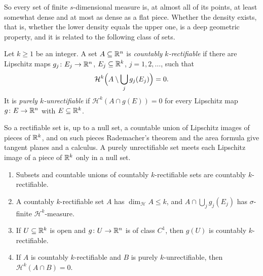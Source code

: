 So every set of finite $s$-dimensional measure is, at almost all of its points, at least somewhat dense and at most as dense as a flat piece. Whether the density exists, that is, whether the lower
density equals the upper one, is a deep geometric property, and it is related to the following class of sets.

\begin{definition}\label{measure-theory:definition-rectifiable}
Let $k \geq 1$ be an integer. A set $A \subseteq \mathbb{R}^n$ is \emph{countably $k$-rectifiable} if there are Lipschitz maps $g_j \colon E_j \to \mathbb{R}^n$, $E_j \subseteq \mathbb{R}^k$, $j = 1, 2, \ldots$, such that
\[
\mathcal{H}^k\Bigl(A \setminus \bigcup_jg_j(E_j)\Bigr) = 0 .
\]
It is \emph{purely $k$-unrectifiable} if $\mathcal{H}^k(A \cap g(E)) = 0$ for every Lipschitz map $g \colon E \to \mathbb{R}^n$ with $E \subseteq \mathbb{R}^k$.
\end{definition}

So a rectifiable set is, up to a null set, a countable union of Lipschitz images of pieces of $\mathbb{R}^k$, and on such pieces Rademacher's theorem and the area formula give tangent planes and a calculus. A
purely unrectifiable set meets each Lipschitz image of a piece of $\mathbb{R}^k$ only in a null set.

\begin{proposition}\label{measure-theory:proposition-rectifiable}
\begin{enumerate}
\item Subsets and countable unions of countably $k$-rectifiable sets are countably $k$-rectifiable.
\item A countably $k$-rectifiable set $A$ has $\dim_{\mathcal{H}}A \leq k$, and $A \cap \bigcup_jg_j(E_j)$ has $\sigma$-finite $\mathcal{H}^k$-measure.
\item If $U \subseteq \mathbb{R}^k$ is open and $g \colon U \to \mathbb{R}^n$ is of class $C^1$, then $g(U)$ is countably $k$-rectifiable.
\item If $A$ is countably $k$-rectifiable and $B$ is purely $k$-unrectifiable, then $\mathcal{H}^k(A \cap B) = 0$.
\end{enumerate}
\end{proposition}

